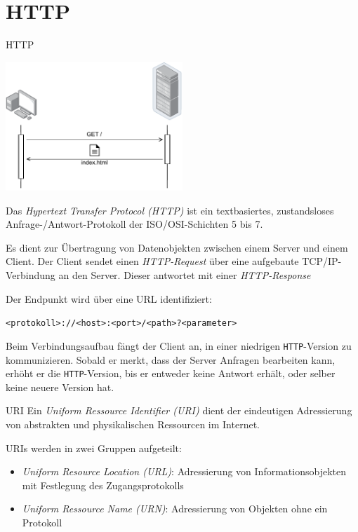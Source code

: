 \section{HTTP}

\begin{defi}{HTTP}
    \begin{center}
        \includegraphics[width=0.5\textwidth]{includes/figures/defi_http.pdf}
    \end{center}

    Das \emph{Hypertext Transfer Protocol (HTTP)} ist ein textbasiertes, zustandsloses Anfrage-/Antwort-Protokoll der ISO/OSI-Schichten 5 bis 7.

    Es dient zur Übertragung von Datenobjekten zwischen einem Server und einem Client.
    Der Client sendet einen \emph{HTTP-Request} über eine aufgebaute TCP/IP-Verbindung an den Server.
    Dieser antwortet mit einer \emph{HTTP-Response}

    Der Endpunkt wird über eine URL identifiziert:

    \begin{center}
        \texttt{<protokoll>://<host>:<port>/<path>?<parameter>}
    \end{center}

    Beim Verbindungsaufbau fängt der Client an, in einer niedrigen \texttt{HTTP}-Version zu kommunizieren.
    Sobald er merkt, dass der Server Anfragen bearbeiten kann, erhöht er die \texttt{HTTP}-Version, bis er entweder keine Antwort erhält, oder selber keine neuere Version hat.
\end{defi}

\begin{defi}{URI}
    Ein \emph{Uniform Ressource Identifier (URI)} dient der eindeutigen Adressierung von abstrakten und physikalischen Ressourcen im Internet.

    URIs werden in zwei Gruppen aufgeteilt:
    \begin{itemize}
        \item \emph{Uniform Resource Location (URL)}: Adressierung von Informationsobjekten mit Festlegung des Zugangsprotokolls
        \item \emph{Uniform Ressource Name (URN)}: Adressierung von Objekten ohne ein Protokoll
    \end{itemize}
\end{defi}

